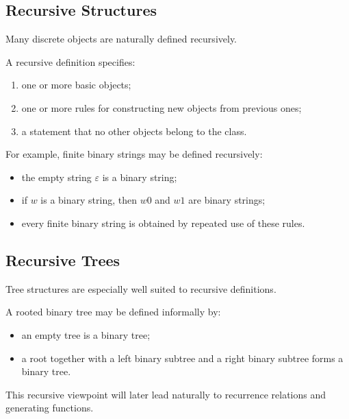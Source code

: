 \subsection{Recursive Structures}
\label{subsec:recursive-structures}

Many discrete objects are naturally defined recursively.

A recursive definition specifies:

\begin{enumerate}
    \item one or more basic objects;
    \item one or more rules for constructing new objects from previous
          ones;
    \item a statement that no other objects belong to the class.
\end{enumerate}

For example, finite binary strings may be defined recursively:

\begin{itemize}
    \item the empty string \(\varepsilon\) is a binary string;
    \item if \(w\) is a binary string, then \(w0\) and \(w1\) are
          binary strings;
    \item every finite binary string is obtained by repeated use of
          these rules.
\end{itemize}

\subsection{Recursive Trees}
\label{subsec:recursive-trees-preview}

Tree structures are especially well suited to recursive definitions.

A rooted binary tree may be defined informally by:

\begin{itemize}
    \item an empty tree is a binary tree;
    \item a root together with a left binary subtree and a right binary
          subtree forms a binary tree.
\end{itemize}

This recursive viewpoint will later lead naturally to recurrence
relations and generating functions.

